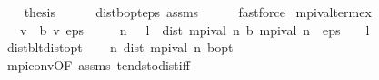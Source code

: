 \begin{isabellebody}
\ \ \isamarkupfalse%
\ {\isacharquery}{\kern0pt}thesis\isanewline
\ \ \ \ \isamarkupfalse%
\ dist{\isacharunderscore}{\kern0pt}{\isasymL}\isactrlsub b{\isacharunderscore}{\kern0pt}opt{\isacharunderscore}{\kern0pt}eps\ assms\isanewline
\ \ \ \ \isamarkupfalse%
\ fastforce\isanewline
{}\isamarkupfalse%
%
\endisatagproof
{\isafoldproof}%
%
\isadelimproof
\isanewline
%
\endisadelimproof
\isanewline
{}\isamarkupfalse%
\ mpi{\isacharunderscore}{\kern0pt}val{\isacharunderscore}{\kern0pt}term{\isacharunderscore}{\kern0pt}ex{\isacharcolon}{\kern0pt}\isanewline
\ \ \ {\isachardoublequoteopen}v{}\ {\isasymle}\ {\isasymL}\isactrlsub b\ v{}{\isachardoublequoteclose}\ {\isachardoublequoteopen}eps\ {\isachargreater}{\kern0pt}\ {}{\isachardoublequoteclose}\isanewline
\ \ \ {\isachardoublequoteopen}{\isasymexists}n{\isachardot}{\kern0pt}\ {}\ {\isacharasterisk}{\kern0pt}\ l\ {\isacharasterisk}{\kern0pt}\ dist\ {\isacharparenleft}{\kern0pt}mpi{\isacharunderscore}{\kern0pt}val\ n{\isacharparenright}{\kern0pt}\ {\isacharparenleft}{\kern0pt}{\isasymL}\isactrlsub b\ {\isacharparenleft}{\kern0pt}mpi{\isacharunderscore}{\kern0pt}val\ n{\isacharparenright}{\kern0pt}{\isacharparenright}{\kern0pt}\ {\isacharless}{\kern0pt}\ eps\ {\isacharasterisk}{\kern0pt}\ {\isacharparenleft}{\kern0pt}{}\ {\isacharminus}{\kern0pt}\ l{\isacharparenright}{\kern0pt}{\isachardoublequoteclose}\isanewline
%
\isadelimproof
%
\endisadelimproof
%
\isatagproof
{}\isamarkupfalse%
\ {\isacharminus}{\kern0pt}\isanewline
\ \ \isamarkupfalse%
\ dist{\isacharunderscore}{\kern0pt}{\isasymL}\isactrlsub b{\isacharunderscore}{\kern0pt}lt{\isacharunderscore}{\kern0pt}dist{\isacharunderscore}{\kern0pt}opt\isanewline
\ \ \isamarkupfalse%
\ {\isachardoublequoteopen}{\isacharparenleft}{\kern0pt}{\isasymlambda}n{\isachardot}{\kern0pt}\ dist\ {\isacharparenleft}{\kern0pt}mpi{\isacharunderscore}{\kern0pt}val\ n{\isacharparenright}{\kern0pt}\ {\isasymnu}\isactrlsub b{\isacharunderscore}{\kern0pt}opt{\isacharparenright}{\kern0pt}\ {\isasymlonglonglongrightarrow}\ {}{\isachardoublequoteclose}\isanewline
\ \ \ \ \isamarkupfalse%
\ mpi{\isacharunderscore}{\kern0pt}conv{\isacharparenleft}{\kern0pt}{}{\isacharparenright}{\kern0pt}{\isacharbrackleft}{\kern0pt}OF\ assms{\isacharparenleft}{\kern0pt}{}{\isacharparenright}{\kern0pt}{\isacharbrackright}{\kern0pt}\ tendsto{\isacharunderscore}{\kern0pt}dist{\isacharunderscore}{\kern0pt}iff\ \isanewline

\end{isabellebody}
